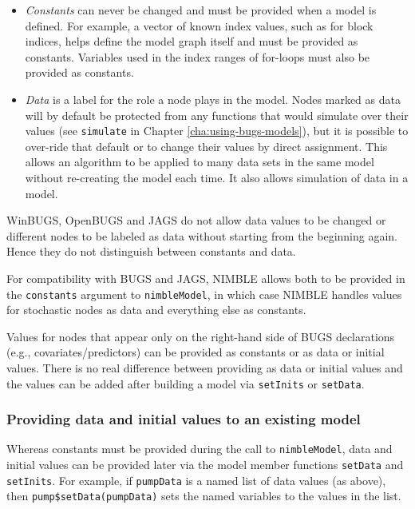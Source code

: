 \documentclass[12pt,oneside]{book}\usepackage[]{graphicx}\usepackage[]{color}
\def\cd#1{\texttt{#1}}
\def\nm#1{\textit{#1}}
\begin{document}
\begin{itemize}
\item \nm{Constants} can never be changed and must be provided when a
  model is defined.  For example, a vector of known index values, such
  as for block indices, helps define the model graph itself and must
  be provided as constants.  Variables used in the index ranges of
  for-loops must also be provided as constants.
\item \nm{Data} is a label for the role a node plays in the model.
  Nodes marked as data will by default be protected from any functions
  that would simulate over their values (see \cd{simulate} in Chapter
  \ref{cha:using-bugs-models}), but it is possible to over-ride
  that default or to change their values by direct assignment.  This
  allows an algorithm to be applied to many data sets in the same
  model without re-creating the model each time.  It also allows
  simulation of data in a model.  
\end{itemize}

WinBUGS, OpenBUGS and JAGS do not allow data values to be changed or
different nodes to be labeled as data without starting from the
beginning again.  Hence they do not distinguish between constants and
data.  

For compatibility with BUGS and JAGS, NIMBLE allows both to be
provided in the \cd{constants} argument to \cd{nimbleModel}, in
which case NIMBLE handles values for stochastic nodes as data and
everything else as constants.

Values for nodes that appear only on the right-hand side of BUGS
declarations (e.g., covariates/predictors) can be provided as constants or as data or initial values. There is no real difference between providing as data or initial values and the values can be added after building a model via \cd{setInits} or \cd{setData}. 

\subsubsection{Providing data and initial values to an existing model}

Whereas constants must be provided during the call to
\cd{nimbleModel}, data and initial values can be provided later via
the model member functions \cd{setData} and \cd{setInits}. For
example, if \cd{pumpData} is a named list of data values (as above),
then \cd{pump\$setData(pumpData)} sets the named variables to the
values in the list.
\end{document}
